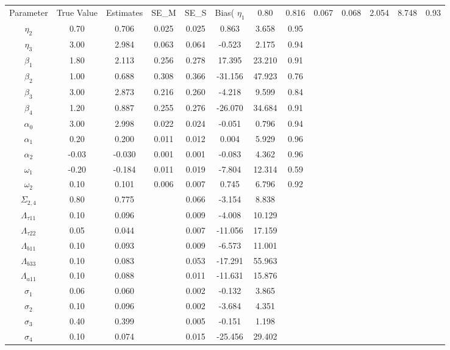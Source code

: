 \begin{table}[ht]
\centering
\begin{tabular}{cccccccc}
  \hline
Parameter & True Value & Estimates & SE_M & SE_S & Bias(%
  \hline
$\eta_1$ & 0.80 & 0.816 & 0.067 & 0.068 & 2.054 & 8.748 & 0.93 \\ 
  $\eta_2$ & 0.70 & 0.706 & 0.025 & 0.025 & 0.863 & 3.658 & 0.95 \\ 
  $\eta_3$ & 3.00 & 2.984 & 0.063 & 0.064 & -0.523 & 2.175 & 0.94 \\ 
  $\beta_1$ & 1.80 & 2.113 & 0.256 & 0.278 & 17.395 & 23.210 & 0.91 \\ 
  $\beta_2$ & 1.00 & 0.688 & 0.308 & 0.366 & -31.156 & 47.923 & 0.76 \\ 
  $\beta_3$ & 3.00 & 2.873 & 0.216 & 0.260 & -4.218 & 9.599 & 0.84 \\ 
  $\beta_4$ & 1.20 & 0.887 & 0.255 & 0.276 & -26.070 & 34.684 & 0.91 \\ 
  $\alpha_0$ & 3.00 & 2.998 & 0.022 & 0.024 & -0.051 & 0.796 & 0.94 \\ 
  $\alpha_1$ & 0.20 & 0.200 & 0.011 & 0.012 & 0.004 & 5.929 & 0.96 \\ 
  $\alpha_2$ & -0.03 & -0.030 & 0.001 & 0.001 & -0.083 & 4.362 & 0.96 \\ 
  $\omega_1$ & -0.20 & -0.184 & 0.011 & 0.019 & -7.804 & 12.314 & 0.59 \\ 
  $\omega_2$ & 0.10 & 0.101 & 0.006 & 0.007 & 0.745 & 6.796 & 0.92 \\ 
   \hline
$\Sigma_{2,4}$ & 0.80 & 0.775 &  & 0.066 & -3.154 & 8.838 &  \\ 
  $\Lambda_{\tau11}$ & 0.10 & 0.096 &  & 0.009 & -4.008 & 10.129 &  \\ 
  $\Lambda_{\tau22}$ & 0.05 & 0.044 &  & 0.007 & -11.056 & 17.159 &  \\ 
  $\Lambda_{b11}$ & 0.10 & 0.093 &  & 0.009 & -6.573 & 11.001 &  \\ 
  $\Lambda_{b33}$ & 0.10 & 0.083 &  & 0.053 & -17.291 & 55.963 &  \\ 
  $\Lambda_{a11}$ & 0.10 & 0.088 &  & 0.011 & -11.631 & 15.876 &  \\ 
  $\sigma_1$ & 0.06 & 0.060 &  & 0.002 & -0.132 & 3.865 &  \\ 
  $\sigma_2$ & 0.10 & 0.096 &  & 0.002 & -3.684 & 4.351 &  \\ 
  $\sigma_3$ & 0.40 & 0.399 &  & 0.005 & -0.151 & 1.198 &  \\ 
  $\sigma_4$ & 0.10 & 0.074 &  & 0.015 & -25.456 & 29.402 &  \\ 
   \hline
\end{tabular}
\end{table}
